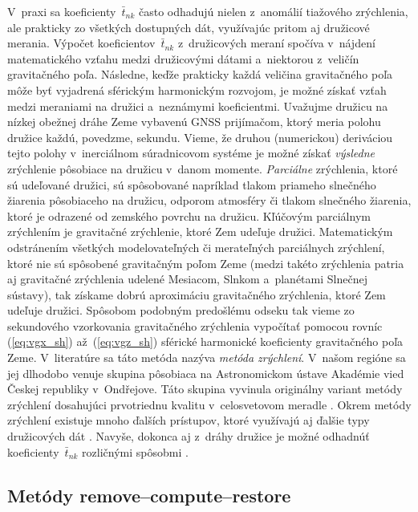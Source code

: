 \documentclass[a4paper, 12pt]{book}
\begin{document}
V~praxi sa koeficienty~$\bar{t}_{nk}$ často odhadujú nielen z~anomálií 
tiažového zrýchlenia, ale prakticky zo všetkých dostupných dát, využívajúc 
pritom aj družicové merania.  Výpočet koeficientov~$\bar{t}_{nk}$ z~družicových 
meraní spočíva v~nájdení matematického vzťahu medzi družicovými dátami 
a~niektorou z~veličín gravitačného poľa.  Následne, keďže prakticky každá 
veličina gravitačného poľa môže byť vyjadrená sférickým harmonickým rozvojom, 
je možné získať vzťah medzi meraniami na družici a~neznámymi koeficientmi.  
Uvažujme družicu na nízkej obežnej dráhe Zeme vybavenú GNSS prijímačom, ktorý 
meria polohu družice každú, povedzme, sekundu.  Vieme, že druhou (numerickou) 
deriváciou tejto polohy v~inerciálnom súradnicovom systéme je možné získať 
\emph{výsledne} zrýchlenie pôsobiace na družicu v~danom momente.  
\emph{Parciálne} zrýchlenia, ktoré sú udeľované družici, sú spôsobované 
napríklad tlakom priameho slnečného žiarenia pôsobiaceho na družicu, odporom 
atmosféry či tlakom slnečného žiarenia, ktoré je odrazené od zemského povrchu 
na družicu.  Kľúčovým parciálnym zrýchlením je gravitačné zrýchlenie, ktoré Zem 
udeľuje družici.  Matematickým odstránením všetkých modelovateľných či 
merateľných parciálnych zrýchlení, ktoré nie sú spôsobené gravitačným poľom 
Zeme (medzi takéto zrýchlenia patria aj gravitačné zrýchlenia udelené Mesiacom, 
Slnkom a~planétami Slnečnej sústavy), tak získame dobrú aproximáciu 
gravitačného zrýchlenia, ktoré Zem udeľuje družici.  Spôsobom podobným 
predošlému odseku tak vieme zo sekundového vzorkovania gravitačného zrýchlenia 
vypočítať pomocou rovníc (\ref{eq:vgx_sh}) až~(\ref{eq:vgz_sh}) sférické 
harmonické koeficienty gravitačného poľa Zeme.  V~literatúre sa táto metóda 
nazýva \emph{metóda zrýchlení}.   V~našom regióne sa jej dlhodobo venuje 
skupina pôsobiaca na Astronomickom ústave Akadémie vied Českej republiky 
v~Ond\v{r}ejove.  Táto skupina vyvinula originálny variant metódy zrýchlení 
dosahujúci prvotriednu kvalitu v~celosvetovom meradle 
\parencite{Bezdek2014,encarnacao2020}.  Okrem metódy zrýchlení existuje mnoho 
ďalších prístupov, ktoré využívajú aj ďalšie typy družicových dát 
\parencite[pozri][]{SeeberSatelliteGeodesy}.  Navyše, dokonca aj z~dráhy 
družice je možné odhadnúť koeficienty~$\bar{t}_{nk}$ rozličnými spôsobmi 
\parencite[napríklad][]{Baur2014}.


\subsection{Metódy remove--compute--restore}
\end{document}
